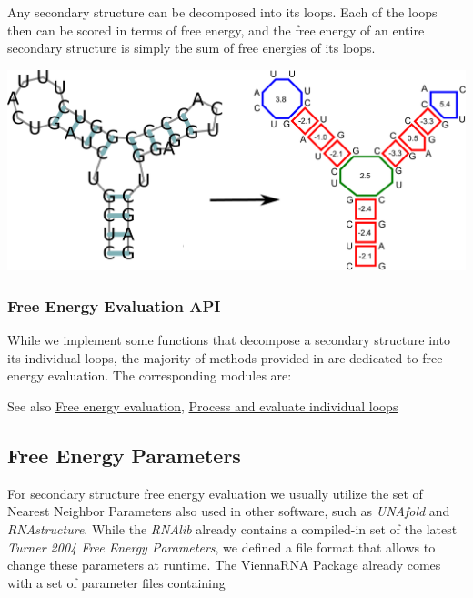 Any secondary structure can be decomposed into its loops. Each of the loops then can be scored in terms of free energy, and the free energy of an entire secondary structure is simply the sum of free energies of its loops.

 
\begin{DoxyImageNoCaption}
  \mbox{\includegraphics[width=\textwidth,height=\textheight/2,keepaspectratio=true]{loop_decomposition}}
\end{DoxyImageNoCaption}
\hypertarget{energy_evaluation_sec_loop_decomposition_api}{}\subsubsection{Free Energy Evaluation A\+PI}\label{energy_evaluation_sec_loop_decomposition_api}
While we implement some functions that decompose a secondary structure into its individual loops, the majority of methods provided in  are dedicated to free energy evaluation. The corresponding modules are\+:

\begin{DoxySeeAlso}{See also}
\hyperlink{group__eval}{Free energy evaluation}, \hyperlink{group__loops}{Process and evaluate individual loops}
\end{DoxySeeAlso}
\hypertarget{energy_evaluation_sec_energy_parameters}{}\subsection{Free Energy Parameters}\label{energy_evaluation_sec_energy_parameters}
For secondary structure free energy evaluation we usually utilize the set of Nearest Neighbor Parameters also used in other software, such as {\itshape U\+N\+Afold} and {\itshape R\+N\+Astructure}. While the {\itshape R\+N\+Alib} already contains a compiled-\/in set of the latest {\itshape Turner 2004 Free Energy Parameters}, we defined a file format that allows to change these parameters at runtime. The {\ttfamily Vienna\+R\+NA Package} already comes with a set of parameter files containing


